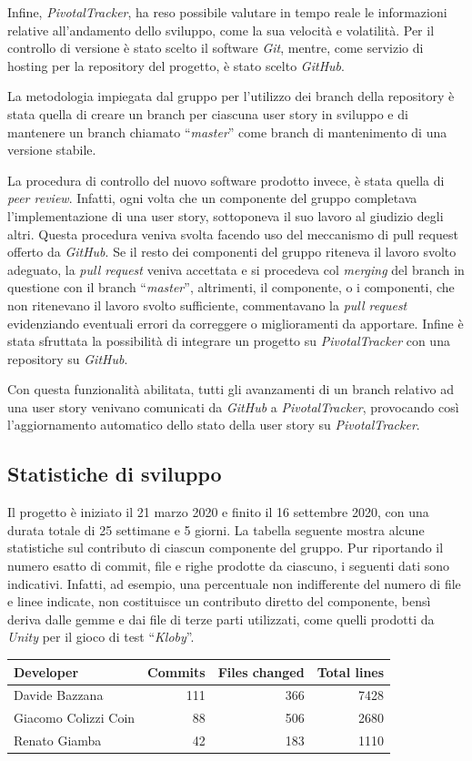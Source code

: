 Infine, \textit{PivotalTracker}, ha reso possibile valutare in tempo
reale le informazioni relative all'andamento dello sviluppo, come la
sua velocità e volatilità.
\newline
\newline
Per il controllo di versione è stato scelto il software \textit{Git},
mentre, come servizio di hosting per la repository del progetto, è
stato scelto \textit{GitHub}.

La metodologia impiegata dal gruppo per l'utilizzo dei branch della
repository è stata quella di creare un branch per ciascuna user story
in sviluppo e di mantenere un branch chiamato ``\textit{master}'' come
branch di mantenimento di una versione stabile.

La procedura di controllo del nuovo software prodotto invece, è stata
quella di \textit{peer review}. Infatti, ogni volta che un componente
del gruppo completava l'implementazione di una user story, sottoponeva
il suo lavoro al giudizio degli altri. Questa procedura veniva svolta
facendo uso del meccanismo di pull request offerto da
\textit{GitHub}. Se il resto dei componenti del gruppo riteneva il
lavoro svolto adeguato, la \textit{pull request} veniva accettata e si
procedeva col \textit{merging} del branch in questione con il branch
``\textit{master}'', altrimenti, il componente, o i componenti, che
non ritenevano il lavoro svolto sufficiente, commentavano la
\textit{pull request} evidenziando eventuali errori da correggere o
miglioramenti da apportare.
\newline
\newline
Infine è stata sfruttata la possibilità di integrare un progetto su
\textit{PivotalTracker} con una repository su \textit{GitHub}.

Con questa funzionalità abilitata, tutti gli avanzamenti di un branch
relativo ad una user story venivano comunicati da \textit{GitHub} a
\textit{PivotalTracker}, provocando così l'aggiornamento automatico
dello stato della user story su \textit{PivotalTracker}.

\subsection{Statistiche di sviluppo}

Il progetto è iniziato il 21 marzo 2020 e finito il 16 settembre
2020, con una durata totale di 25 settimane e 5 giorni.
\newline
\newline
La tabella seguente mostra alcune statistiche sul contributo di
ciascun componente del gruppo. Pur riportando il numero esatto di
commit, file e righe prodotte da ciascuno, i seguenti dati sono
indicativi. Infatti, ad esempio, una percentuale non indifferente del
numero di file e linee indicate, non costituisce un contributo diretto
del componente, bensì deriva dalle gemme e dai file di terze parti
utilizzati, come quelli prodotti da \textit{Unity} per il
gioco di test ``\textit{Kloby}''.

\vspace{1cm}
\begin{tabular}{l|r|r|r}
  \textbf{Developer} & \textbf{Commits} & \textbf{Files changed} & \textbf{Total lines} \\
  \hline
  Davide Bazzana & 111 & 366 & 7428 \\
  \hline
  Giacomo Colizzi Coin & 88 & 506 & 2680 \\
  \hline
  Renato Giamba & 42 & 183 & 1110 \\
  \hline
\end{tabular}

